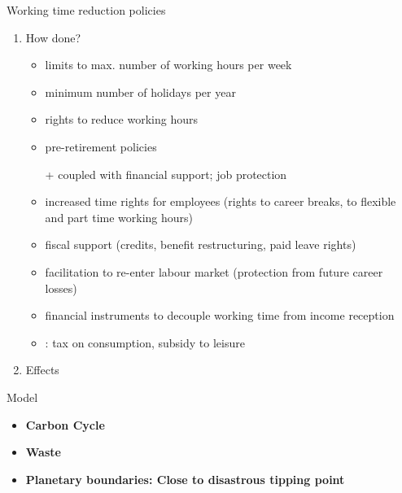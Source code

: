 \documentclass[11pt,aspectratio=169]{beamer}
\begin{document}
\begin{frame}{Working time reduction policies}
\begin{enumerate}
\item How done? \citep{Pullinger2014WorkingDesign}
\begin{itemize}
\item limits to max. number of working hours per week
\item minimum number of holidays per year
\item rights to reduce working hours
\item pre-retirement policies
\item[+] coupled with financial support; job protection
\item increased time rights for employees (rights to career breaks, to flexible and part time working hours)
\item fiscal support (credits, benefit restructuring, paid leave rights)
\item  facilitation to re-enter labour market (protection from future career losses)
\item financial instruments to decouple working time from income reception
\item \citep{Alvarez-Cuadrado2007EnvyHours}: tax on consumption, subsidy to leisure
\end{itemize}
\item Effects
\end{enumerate}
\end{frame}
\begin{frame}{Model}
\begin{itemize}
\item \textbf{Carbon Cycle}
\item \textbf{Waste}
\item \textbf{Planetary boundaries: Close to disastrous tipping point }
\end{itemize}
\end{frame}
\end{document}
